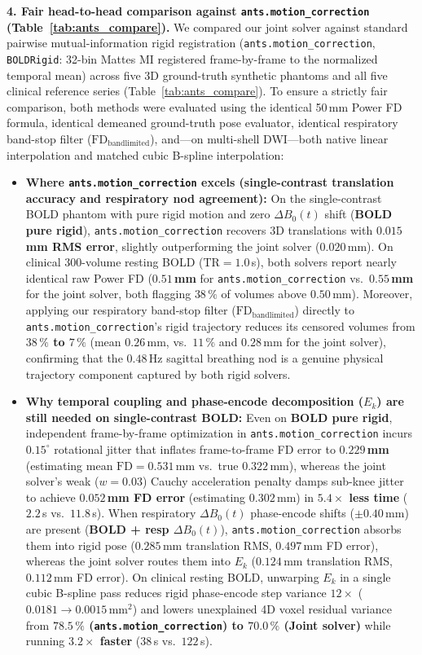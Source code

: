 \documentclass[11pt]{article}
\begin{document}
\textbf{4. Fair head-to-head comparison against \texttt{ants.motion\_correction} (Table~\ref{tab:ants_compare}).}
We compared our joint solver against standard pairwise mutual-information rigid registration (\texttt{ants.motion\_correction}, \texttt{BOLDRigid}: 32-bin Mattes MI registered frame-by-frame to the normalized temporal mean) across five 3D ground-truth synthetic phantoms and all five clinical reference series (Table~\ref{tab:ants_compare}). To ensure a strictly fair comparison, both methods were evaluated using the identical 50\,mm Power FD formula, identical demeaned ground-truth pose evaluator, identical respiratory band-stop filter ($\text{FD}_{\text{bandlimited}}$), and—on multi-shell DWI—both native linear interpolation and matched cubic B-spline interpolation:
\begin{itemize}
\item \textbf{Where \texttt{ants.motion\_correction} excels (single-contrast translation accuracy and respiratory nod agreement):} On the single-contrast BOLD phantom with pure rigid motion and zero $\Delta B_0(t)$ shift (\textbf{BOLD pure rigid}), \texttt{ants.motion\_correction} recovers 3D translations with \textbf{$0.015$\,mm RMS error}, slightly outperforming the joint solver ($0.020$\,mm). On clinical 300-volume resting BOLD ($\text{TR} = 1.0$\,s), both solvers report nearly identical raw Power FD (\textbf{$0.51$\,mm} for \texttt{ants.motion\_correction} vs.\ \textbf{$0.55$\,mm} for the joint solver, both flagging \textbf{$38\,\%$} of volumes above $0.50$\,mm). Moreover, applying our respiratory band-stop filter ($\text{FD}_{\text{bandlimited}}$) directly to \texttt{ants.motion\_correction}'s rigid trajectory reduces its censored volumes from \textbf{$38\,\%$ to $7\,\%$} (mean $0.26$\,mm, vs.\ $11\,\%$ and $0.28$\,mm for the joint solver), confirming that the $0.48$\,Hz sagittal breathing nod is a genuine physical trajectory component captured by both rigid solvers.
\item \textbf{Why temporal coupling and phase-encode decomposition ($E_k$) are still needed on single-contrast BOLD:} Even on \textbf{BOLD pure rigid}, independent frame-by-frame optimization in \texttt{ants.motion\_correction} incurs $0.15^\circ$ rotational jitter that inflates frame-to-frame FD error to \textbf{$0.229$\,mm} (estimating mean $\text{FD} = 0.531$\,mm vs.\ true $0.322$\,mm), whereas the joint solver's weak ($w = 0.03$) Cauchy acceleration penalty damps sub-knee jitter to achieve \textbf{$0.052$\,mm FD error} (estimating $0.302$\,mm) in \textbf{$5.4\times$ less time} ($2.2$\,s vs.\ $11.8$\,s). When respiratory $\Delta B_0(t)$ phase-encode shifts ($\pm 0.40$\,mm) are present (\textbf{BOLD + resp $\Delta B_0(t)$}), \texttt{ants.motion\_correction} absorbs them into rigid pose ($0.285$\,mm translation RMS, $0.497$\,mm FD error), whereas the joint solver routes them into $E_k$ ($0.124$\,mm translation RMS, $0.112$\,mm FD error). On clinical resting BOLD, unwarping $E_k$ in a single cubic B-spline pass reduces rigid phase-encode step variance $12\times$ ($0.0181 \to 0.0015\,\text{mm}^2$) and lowers unexplained 4D voxel residual variance from \textbf{$78.5\,\%$ (\texttt{ants.motion\_correction}) to $70.0\,\%$ (Joint solver)} while running \textbf{$3.2\times$ faster} ($38$\,s vs.\ $122$\,s).

\end{itemize}
\end{document}
